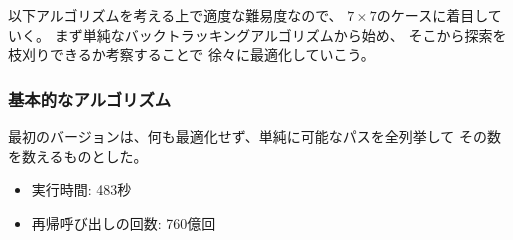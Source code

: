 \begin{comment}
We focus on the $7 \times 7$ case,
because its level of difficulty is appropriate to our needs.
We begin with a straightforward backtracking algorithm,
and then optimize it step by step using observations
of how the search can be pruned.
After each optimization, we measure the running time
of the algorithm and the number of recursive calls,
so that we clearly see the effect of each
optimization on the efficiency of the search.
\end{comment}

以下アルゴリズムを考える上で適度な難易度なので、
$7 \times 7$のケースに着目していく。
まず単純なバックトラッキングアルゴリズムから始め、
そこから探索を枝刈りできるか考察することで
徐々に最適化していこう。


\begin{comment}
\subsubsection{Basic algorithm}

The first version of the algorithm does not contain
any optimizations. We simply use backtracking to generate
all possible paths from the upper-left corner to
the lower-right corner and count the number of such paths.

\begin{itemize}
\item
running time: 483 seconds
\item
number of recursive calls: 76 billion
\end{itemize}
\end{comment}

\subsubsection{基本的なアルゴリズム}

最初のバージョンは、何も最適化せず、単純に可能なパスを全列挙して
その数を数えるものとした。

\begin{itemize}
\item
実行時間: 483秒
\item
再帰呼び出しの回数: 760億回
\end{itemize}

\begin{comment}
\subsubsection{Optimization 1}

In any solution, we first move one step
down or right.
There are always two paths that 
are symmetric
about the diagonal of the grid
after the first step.
For example, the following paths are symmetric:
\end{comment}

